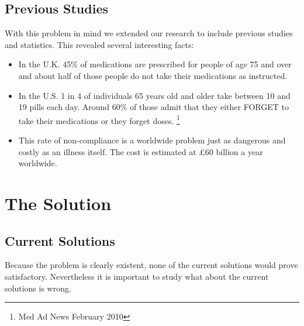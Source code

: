 \documentclass[12pt]{article}
\begin{document}
	\subsection{Previous Studies}
	With this problem in mind we extended our research to include previous studies and statistics. This revealed several interesting facts:
	\begin{itemize}
	\item In the U.K. 45\% of medications are prescribed for people of age 75 and over and about half of those people do not take their medications as instructed. 
	\item In the U.S. 1 in 4 of individuals 65 years old and older take between 10 and 19 pills each day. Around 60\% of those admit that they either FORGET to take their medications or they forget doses. \footnote{Med Ad News February 2010}
	\item This rate of non-compliance is a worldwide problem just as dangerous and costly as an illness itself. The cost is estimated at £60 billion a year worldwide.
	\end{itemize}


\section{The Solution}
	\subsection{Current Solutions}
	Because the problem is clearly existent, none of the current solutions would prove satisfactory. Nevertheless it is important to study what about the current solutions is wrong.
\end{document}
